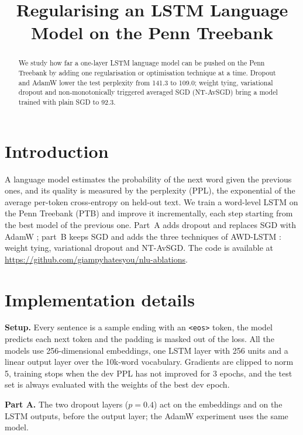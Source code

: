 \documentclass[a4paper]{article}
\title{Regularising an LSTM Language Model on the Penn Treebank}
\begin{document}
\maketitle

\begin{abstract}
We study how far a one-layer LSTM language model can be pushed on the Penn Treebank by adding one regularisation
or optimisation technique at a time. Dropout and AdamW lower the test perplexity from 141.3 to 109.0; weight tying,
variational dropout and non-monotonically triggered averaged SGD (NT-AvSGD) bring a model trained with plain SGD
to 92.3.
\end{abstract}

\section{Introduction}

A language model estimates the probability of the next word given the previous ones, and its quality is measured
by the perplexity (PPL), the exponential of the average per-token cross-entropy on held-out text. We train a
word-level LSTM \cite{hochreiter1997lstm} on the Penn Treebank (PTB) \cite{marcus1993ptb,mikolov2010rnnlm} and
improve it incrementally, each step starting from the best model of the previous one. Part~A adds dropout \cite{srivastava2014dropout} and replaces SGD with AdamW
\cite{loshchilov2019adamw}; part~B keeps SGD and adds the three techniques of AWD-LSTM \cite{merity2018awdlstm}:
weight tying, variational dropout and NT-AvSGD. The code is available at
\url{https://github.com/giampyhatesyou/nlu-ablations}.

\section{Implementation details}

\textbf{Setup.} Every sentence is a sample ending with an \texttt{<eos>} token, the model predicts each next token
and the padding is masked out of the loss. All the models use 256-dimensional embeddings, one LSTM layer with 256
units and a linear output layer over the 10k-word vocabulary. Gradients are clipped to norm 5, training stops when
the dev PPL has not improved for 3 epochs, and the test set is always evaluated with the weights of the best dev
epoch.

\textbf{Part A.} The two dropout layers ($p=0.4$) act on the embeddings and on the LSTM outputs, before the output
layer; the AdamW experiment uses the same model.
\end{document}
